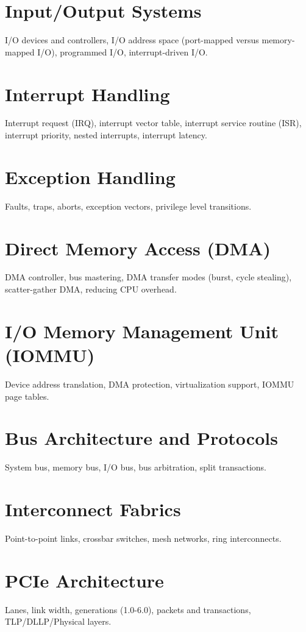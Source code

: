 
\chapter{Input/Output Systems}
I/O devices and controllers, I/O address space (port-mapped versus memory-mapped I/O), programmed I/O, interrupt-driven I/O.

\chapter{Interrupt Handling}
Interrupt request (IRQ), interrupt vector table, interrupt service routine (ISR), interrupt priority, nested interrupts, interrupt latency.

\chapter{Exception Handling}
Faults, traps, aborts, exception vectors, privilege level transitions.

\chapter{Direct Memory Access (DMA)}
DMA controller, bus mastering, DMA transfer modes (burst, cycle stealing), scatter-gather DMA, reducing CPU overhead.

\chapter{I/O Memory Management Unit (IOMMU)}
Device address translation, DMA protection, virtualization support, IOMMU page tables.

\chapter{Bus Architecture and Protocols}
System bus, memory bus, I/O bus, bus arbitration, split transactions.

\chapter{Interconnect Fabrics}
Point-to-point links, crossbar switches, mesh networks, ring interconnects.

\chapter{PCIe Architecture}
Lanes, link width, generations (1.0-6.0), packets and transactions, TLP/DLLP/Physical layers.


